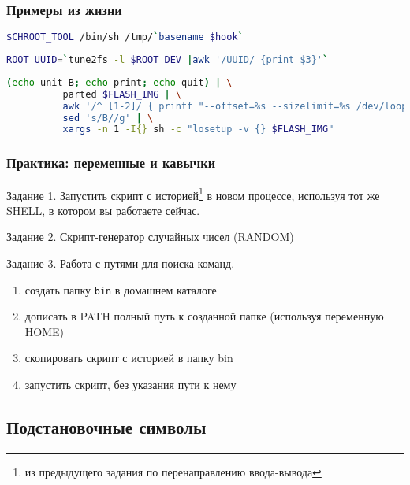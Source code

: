 \begin{frame}[fragile]
  \frametitle{Примеры из жизни}
\begin{lstlisting}[language=sh,frame=single,basicstyle=\normalsize,breaklines=true]
    $CHROOT_TOOL /bin/sh /tmp/`basename $hook`
\end{lstlisting} \pause

\begin{lstlisting}[language=sh,frame=single,basicstyle=\normalsize,breaklines=true]
    ROOT_UUID=`tune2fs -l $ROOT_DEV |awk '/UUID/ {print $3}'`
\end{lstlisting} \pause
  
\begin{lstlisting}[language=sh,frame=single,basicstyle=\small,breaklines=true]
    (echo unit B; echo print; echo quit) | \
          parted $FLASH_IMG | \
          awk '/^ [1-2]/ { printf "--offset=%s --sizelimit=%s /dev/loop%s\n", $2, $4, $1 }' | \
          sed 's/B//g' | \
          xargs -n 1 -I{} sh -c "losetup -v {} $FLASH_IMG"
\end{lstlisting}
\end{frame}

\begin{frame}[fragile]
  \frametitle{Практика: переменные и кавычки}
  
  \normalsize{ }
  \alert{Задание 1.}
  Запустить скрипт с историей\footnote{из предыдущего задания по перенаправлению ввода-вывода} в новом процессе, используя тот же SHELL, в котором вы работаете сейчас.  \pause

  \alert{Задание 2.}
  Скрипт-генератор случайных чисел (RANDOM) \pause

  \alert{Задание 3.} Работа с путями для поиска команд.
    \begin{enumerate}
      \item создать папку \verb+bin+ в домашнем каталоге
      \item дописать в PATH полный путь к созданной папке (используя переменную HOME)
      \item скопировать скрипт с историей в папку bin
      \item запустить скрипт, без указания пути к нему 
    \end{enumerate}

\end{frame}

\subsection{Подстановочные символы}

